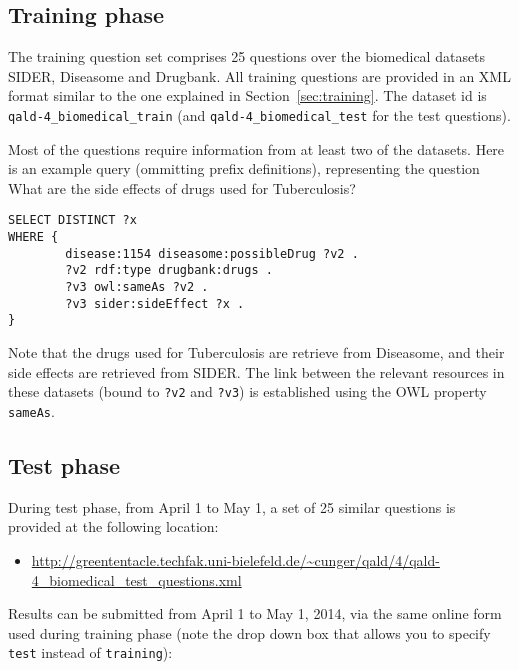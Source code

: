 \subsection{Training phase}

The training question set comprises 25 questions over the biomedical datasets SIDER, Diseasome and Drugbank. 
All training questions are provided in an XML format similar to the one explained in Section~\ref{sec:training}. 
The dataset id is \texttt{qald-4\_biomedical\_train} (and \texttt{qald-4\_biomedical\_test} for the test questions).

Most of the questions require information from at least two of the datasets. 
Here is an example query (ommitting prefix definitions), 
representing the question {\sf What are the side effects of drugs used for Tuberculosis?}
%
\begin{lstlisting}
SELECT DISTINCT ?x
WHERE {
        disease:1154 diseasome:possibleDrug ?v2 .
        ?v2 rdf:type drugbank:drugs .
        ?v3 owl:sameAs ?v2 .
        ?v3 sider:sideEffect ?x .
}
\end{lstlisting}
%
Note that the drugs used for Tuberculosis are retrieve from Diseasome, and their side effects are retrieved from SIDER. 
The link between the relevant resources in these datasets (bound to \texttt{?v2} and \texttt{?v3}) is established using 
the OWL property \texttt{sameAs}. 


\subsection{Test phase}

During test phase, from April 1 to May 1, a set of 25 similar questions is provided at the following location:
\begin{itemize} 
\item[] \url{http://greententacle.techfak.uni-bielefeld.de/~cunger/qald/4/qald-4_biomedical_test_questions.xml} 
\end{itemize} 

Results can be submitted from April 1 to May 1, 2014, via the same online form used during training phase 
(note the drop down box that allows you to specify {\tt test} instead of {\tt training}):

